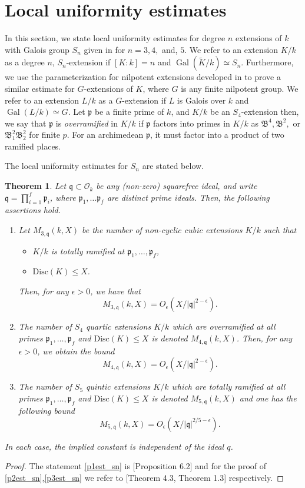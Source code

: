 \documentclass[11pt]{amsart}
\newtheorem{theorem}{Theorem}[section]
\newcommand{\fq}{\mathfrak{q}}
\newcommand{\fB}{\mathfrak{B}}
\newcommand{\p}{\mathfrak{p}}
\newcommand{\cO}{\mathcal{O}}
\newcommand{\fp}{\mathfrak{p}}
\newcommand{\disc}{\mathrm{Disc}}
\newcommand{\op}[1]{\operatorname{#1}}
\numberwithin{equation}{section}
\begin{document}
\section{Local uniformity estimates}\label{s 3}
In this section, we state local uniformity estimates for degree $n$ extensions of $k$ with Galois group $S_n$ given in \cite[Section 4]{Wang2020} for $n=3,4,$ and, $5$. We refer to an extension $K/k$ as a degree $n$, $S_n$-extension if $[K:k]=n$ and $\op{Gal}(\widetilde{K}/k)\simeq S_n$. Furthermore, we use the parameterization for nilpotent extensions developed in \cite{koymanspagano2023} to prove a similar estimate for $G$-extensions of $K$, where $G$ is any finite nilpotent group. We refer to an extension $L/k$ as a $G$-extension if $L$ is Galois over $k$ and $\op{Gal}(L/k) \simeq G$. Let $\fp$ be a finite prime of $k$, and $K/k$ be an $S_4$-extension then, we say that $\p$ is \textit{overramified} in $K/k$ if $\p$ factors into primes in $K/k$ as $\fB^4, \fB^2,$ or $\fB_1^2\fB_2^2$ for finite $p$. For an archimedean $\p$, it must factor into a product of two ramified places.
 
 \par The local uniformity estimates for $S_n$ are stated below.
\begin{theorem}\label{est_sn}
    Let $\fq\subset \cO_k$ be any (non-zero) squarefree ideal, and write $\fq = \prod_{i=1}^f \fp_i$, where $\fp_1, \dots \fp_f$ are distinct prime ideals. Then, the following assertions hold.
    \begin{enumerate}
        \item\label{p1est_sn} Let $M_{3,\fq}(k,X)$ be the number of non-cyclic cubic extensions $K/k$ such that 
        \begin{itemize}
            \item $K/k$ is totally ramified at $\fp_1,\dots, \fp_f$,
            \item $\disc(K) \leq X$.
        \end{itemize}Then, for any $\epsilon>0$, we have that \[M_{3, \fq}(k,X)=O_{\epsilon}(X/|\fq|^{2-\epsilon}).\]
        \item\label{p2est_sn} The number of $S_4$ quartic extensions $K/k$ which are overramified at all primes $\fp_1,\dots, \fp_f$ and $\disc(K) \leq X$ is denoted $M_{4, \fq}(k, X)$. Then, for any $\epsilon>0$, we obtain the bound \[M_{4, \fq}(k, X)=O_{\epsilon}(X/|\fq|^{2-\epsilon}).\]
        \item\label{p3est_sn} The number of $S_5$ quintic extensions $K/k$ which are totally ramified at all primes $\fp_1,\dots, \fp_f$ and $\disc(K) \leq X$ is denoted $M_{5, \fq}(k, X)$ and one has the following bound \[M_{5, \fq}(k, X)=O_{\epsilon}(X/|\fq|^{2/5-\epsilon}).\]
    \end{enumerate}
    In each case, the implied constant is independent of the ideal $q$.
\end{theorem}
\begin{proof}
    The statement \eqref{p1est_sn} is \cite{dw88}[Proposition 6.2] and for the proof of \eqref{p2est_sn},\eqref{p3est_sn} we refer to \cite{Wang2020}[Theorem 4.3, Theorem 1.3] respectively.
\end{proof}
\end{document}
